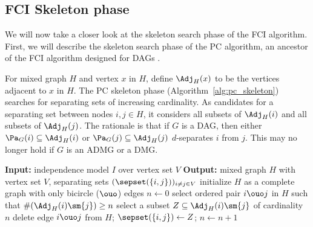 \subsection{FCI Skeleton phase}\label{sec:fci_skeleton}

We will now take a closer look at the skeleton search phase of the FCI algorithm.
First, we will describe the skeleton search phase of the PC algorithm, an ancestor of the FCI algorithm designed for DAGs \cite{SGS2000}.

For mixed graph $H$ and vertex $x$ in $H$, define $\Adj_H(x)$ to be the vertices adjacent to $x$ in $H$.
The PC skeleton phase (Algorithm~\ref{alg:pc_skeleton}) searches for separating sets of increasing cardinality. 
As candidates for a separating set between nodes $i,j \in H$, it considers all subsets of $\Adj_H(i)$ and all subsets of $\Adj_H(j)$.
The rationale is that if $G$ is a DAG, then either $\Pa_G(i) \subseteq \Adj_H(i)$ or $\Pa_G(j) \subseteq \Adj_H(j)$ $d$-separates $i$ from $j$.
This may no longer hold if $G$ is an ADMG or a DMG.

\begin{algorithm}
  \begin{algorithmic}
  \State \textbf{Input:} independence model $I$ over vertex set $V$
  \State \textbf{Output:} mixed graph $H$ with vertex set $V$, separating sets $(\sepset(\{i,j\}))_{i\ne j \in V}$
  \State initialize $H$ as a complete graph with only bicircle ($\ouo$) edges
  \State $n \leftarrow 0$
    \Repeat
    \Repeat
    \State select ordered pair $i \ouo j$ in $H$ such that $\#(\Adj_H(i)\sm\{j\}) \ge n$
    \State select a subset $Z \subseteq \Adj_H(i)\sm\{j\}$ of cardinality $n$
      \State delete edge $i \ouo j$ from $H$;
      \State $\sepset(\{i,j\}) \leftarrow Z$;
    \EndIf
    \State $n \leftarrow n + 1$
  \end{algorithmic}
  \caption{PC skeleton algorithm $\mathtt{PCskeleton}(V,I)$.\label{alg:pc_skeleton}}
\end{algorithm}

